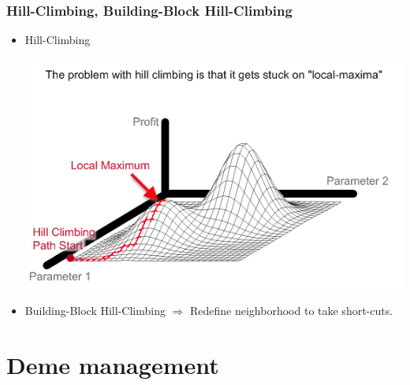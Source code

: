 \documentclass{beamer}
\begin{document}
\frame
{
  \frametitle{Hill-Climbing, Building-Block Hill-Climbing}

  \begin{itemize}
  \item<+-> Hill-Climbing
    \begin{center}
      \includegraphics[scale=0.3]{HillClimbingLocalMax.png}
    \end{center}
  \item<+-> Building-Block Hill-Climbing $\Rightarrow$
    Redefine neighborhood to take short-cuts.
  \end{itemize}
  
}

\section{Deme management}

\end{document}
